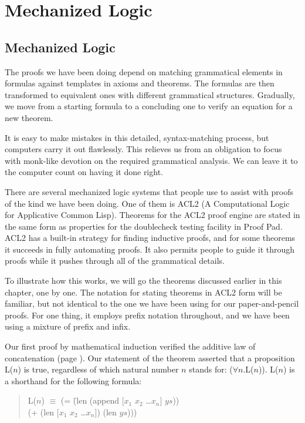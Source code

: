 \chapter{Mechanized Logic}
\label{ch:mechanized-logic}

\section{Mechanized Logic}
\label{sec:mech-logic}
The proofs we have been doing depend on matching grammatical elements in formulas
against templates in axioms and theorems.
The formulas are then transformed to equivalent ones with different grammatical structures.
Gradually, we move from a starting formula to a concluding one to verify an equation for a new theorem.

It is easy to make mistakes in this detailed, syntax-matching process,
but computers carry it out flawlessly.
This relieves us from an obligation to focus with monk-like devotion on the required grammatical analysis.
We can leave it to the computer count on having it done right.

There are several mechanized logic systems that people use
to assist with proofs of the kind we have been doing.
One of them is ACL2 (A Computational Logic for Applicative Common Lisp).
Theorems for the ACL2 proof engine are stated in the same form
as properties for the doublecheck testing facility in Proof Pad.
ACL2 has a built-in strategy for finding inductive proofs,
and for some theorems it succeeds in fully automating proofs.
It also permits people to guide it through proofs while it pushes through all of the grammatical details.

To illustrate how this works, we will go the theorems
discussed earlier in this chapter, one by one.
The notation for stating theorems in ACL2 form will be familiar,
but not identical to the one we have been using
for our paper-and-pencil proofs.
For one thing, it employs prefix notation throughout,
and we have been using a mixture of prefix and infix.

Our first proof by mathematical induction verified
the additive law of concatenation (page \pageref{additive-law-concatenation}).
Our statement of the theorem asserted that a proposition L($n$) is true,
regardless of which natural number $n$ stands for: ($\forall$$n$.L($n$)).
 L($n$) is a shorthand for the following formula:
\begin{quote}
\begin{tabbing}
L($n$) $\equiv$ (= \=(len (append [$x_1$ $x_2$ \dots $x_n$] $ys$))  \\
                   \>(+ (len [$x_1$ $x_2$ \dots $x_n$]) (len $ys$)))
\end{tabbing}
\end{quote}

